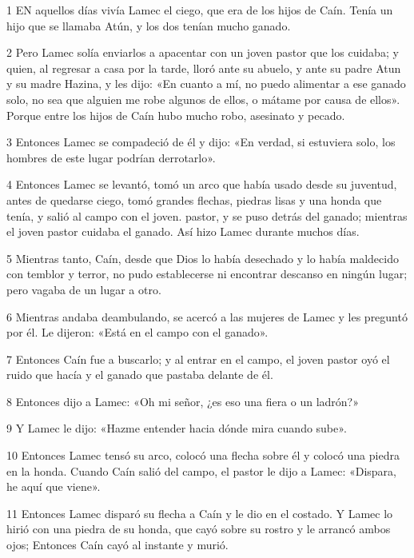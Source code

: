 \par 1 EN aquellos días vivía Lamec el ciego, que era de los hijos de Caín. Tenía un hijo que se llamaba Atún, y los dos tenían mucho ganado.

\par 2 Pero Lamec solía enviarlos a apacentar con un joven pastor que los cuidaba; y quien, al regresar a casa por la tarde, lloró ante su abuelo, y ante su padre Atun y su madre Hazina, y les dijo: «En cuanto a mí, no puedo alimentar a ese ganado solo, no sea que alguien me robe algunos de ellos, o mátame por causa de ellos». Porque entre los hijos de Caín hubo mucho robo, asesinato y pecado.

\par 3 Entonces Lamec se compadeció de él y dijo: «En verdad, si estuviera solo, los hombres de este lugar podrían derrotarlo».

\par 4 Entonces Lamec se levantó, tomó un arco que había usado desde su juventud, antes de quedarse ciego, tomó grandes flechas, piedras lisas y una honda que tenía, y salió al campo con el joven. pastor, y se puso detrás del ganado; mientras el joven pastor cuidaba el ganado. Así hizo Lamec durante muchos días.

\par 5 Mientras tanto, Caín, desde que Dios lo había desechado y lo había maldecido con temblor y terror, no pudo establecerse ni encontrar descanso en ningún lugar; pero vagaba de un lugar a otro.

\par 6 Mientras andaba deambulando, se acercó a las mujeres de Lamec y les preguntó por él. Le dijeron: «Está en el campo con el ganado».

\par 7 Entonces Caín fue a buscarlo; y al entrar en el campo, el joven pastor oyó el ruido que hacía y el ganado que pastaba delante de él.

\par 8 Entonces dijo a Lamec: «Oh mi señor, ¿es eso una fiera o un ladrón?»

\par 9 Y Lamec le dijo: «Hazme entender hacia dónde mira cuando sube».

\par 10 Entonces Lamec tensó su arco, colocó una flecha sobre él y colocó una piedra en la honda. Cuando Caín salió del campo, el pastor le dijo a Lamec: «Dispara, he aquí que viene».

\par 11 Entonces Lamec disparó su flecha a Caín y le dio en el costado. Y Lamec lo hirió con una piedra de su honda, que cayó sobre su rostro y le arrancó ambos ojos; Entonces Caín cayó al instante y murió.

